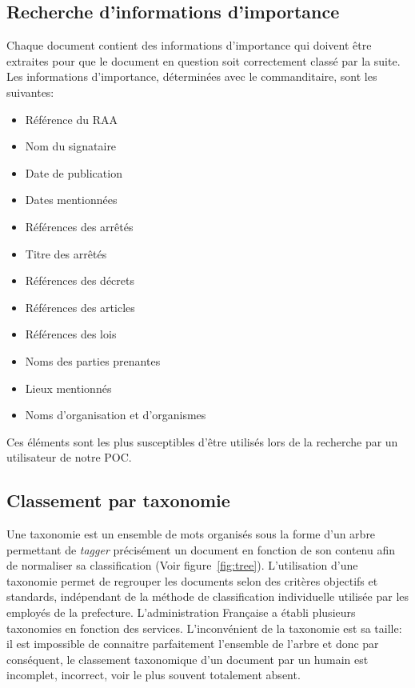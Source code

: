 \subsection{Recherche d'informations d'importance} 
Chaque document contient des informations d'importance qui doivent être extraites pour que le document en question soit correctement classé par la suite.
Les informations d'importance, déterminées avec le commanditaire, sont les suivantes:
\begin{itemize}
\item Référence du RAA
\item Nom du signataire
\item Date de publication
\item Dates mentionnées
\item Références des arrêtés
\item Titre des arrêtés
\item Références des décrets
\item Références des articles
\item Références des lois
\item Noms des parties prenantes
\item Lieux mentionnés
\item Noms d'organisation et d'organismes
\end{itemize}

Ces éléments sont les plus susceptibles d'être utilisés lors de la recherche par un utilisateur de notre POC\@.



\subsection{Classement par taxonomie}
Une taxonomie est un ensemble de mots organisés sous la forme d'un arbre permettant de \textit{tagger} précisément un document en fonction de son contenu afin de normaliser sa classification (Voir figure~\ref{fig:tree}).
L'utilisation d'une taxonomie permet de regrouper les documents selon des critères objectifs et standards, indépendant de la méthode de classification individuelle utilisée par les employés de la prefecture.
L'administration Française a établi plusieurs taxonomies en fonction des services.
L'inconvénient de la taxonomie est sa taille: il est impossible de connaitre parfaitement l'ensemble de l'arbre et donc par conséquent, le classement taxonomique d'un document par un humain est incomplet, incorrect, voir le plus souvent totalement absent.

